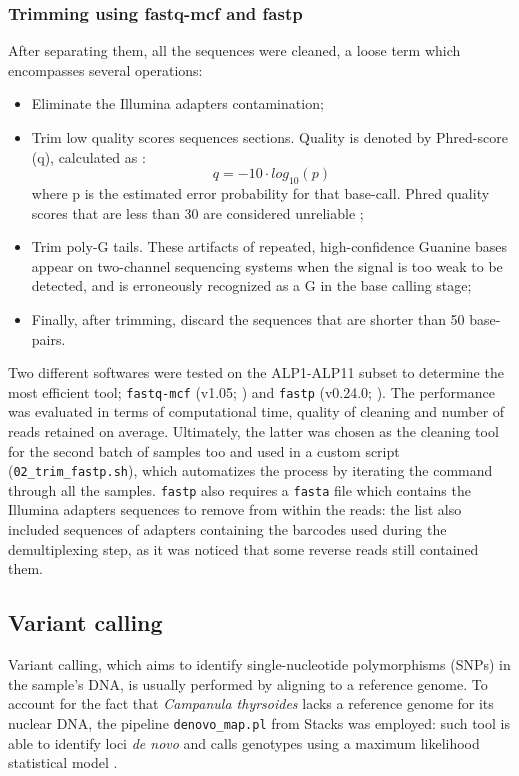 \documentclass[a4paper, 12pt]{report}
\begin{document}
\subsubsection{Trimming using fastq-mcf and fastp}
After separating them, all the sequences were cleaned, a loose term which encompasses several operations:
\vspace{-1.5em}
\begin{itemize}\setlength\itemsep{-0.2em}
	\item Eliminate the Illumina adapters contamination;
	\item Trim low quality scores sequences sections. Quality is denoted by Phred-score (q), calculated as \parencite{ewingBaseCallingAutomatedSequencer1998}:
	\begin{equation}
		q = -10 \cdot log_{10}(p) 
	\end{equation}
	where p is the estimated error probability for that base-call. Phred quality scores that are less
	than 30 are considered unreliable \parencite{oraweAccountingUncertaintyDNA2015};
	\item Trim poly-G tails. These artifacts of repeated, high-confidence Guanine bases appear on two-channel sequencing systems when the signal is too weak to be detected, and is erroneously recognized as a G in the base calling stage;
	\item Finally, after trimming, discard the sequences that are shorter than 50 base-pairs.
\end{itemize}
\vspace{-1.5em}
Two different softwares were tested on the ALP1-ALP11 subset to determine the most efficient tool; \texttt{fastq-mcf} (v1.05; \cite{aronestyEautils2011}) and \texttt{fastp} (v0.24.0; \cite{chenFastpUltrafastAllinone2018}). The performance was evaluated in terms of computational time, quality of cleaning and number of reads retained on average. Ultimately, the latter was chosen as the cleaning tool for the second batch of samples too and used in a custom script (\texttt{02\_trim\_fastp.sh}), which automatizes the process by iterating the command through all the samples. \texttt{fastp} also requires a \texttt{fasta} file which contains the Illumina adapters sequences to remove from within the reads: the list also included sequences of adapters containing the barcodes used during the demultiplexing step, as it was noticed that some reverse reads still contained them.

\subsection{Variant calling}\label{variant-calling}
Variant calling, which aims to identify single-nucleotide polymorphisms (SNPs) in the sample's DNA, is usually performed by aligning to a reference genome. To account for the fact that \textit{Campanula thyrsoides} lacks a reference genome for its nuclear DNA, the pipeline \texttt{denovo\_map.pl} from Stacks was employed: such tool is able to identify loci \textit{de novo} and calls genotypes using a maximum likelihood statistical model \parencite{catchenStacksBuildingGenotyping2011}.
\end{document}
